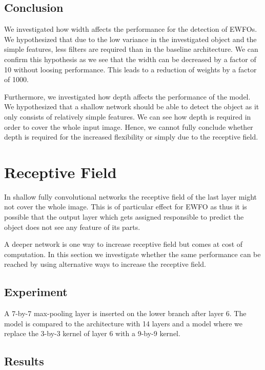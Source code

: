 	\subsection{Conclusion}
	
	We investigated how width affects the performance for the detection of \acp{EWFO}. We hypothesized that due to the low variance in the investigated object and the simple features, less filters are required than in the baseline architecture. We can confirm this hypothesis as we see that the width can be decreased by a factor of 10 without loosing performance. This leads to a reduction of weights by a factor of 1000. 
	
	Furthermore, we investigated how depth affects the performance of the model. We hypothesized that a shallow network should be able to detect the object as it only consists of relatively simple features. We can see how depth is required in order to cover the whole input image. Hence, we cannot fully conclude whether depth is required for the increased flexibility or simply due to the receptive field. 
	
	\section{Receptive Field}
	
	In shallow fully convolutional networks the receptive field of the last layer might not cover the whole image. This is of particular effect for \ac{EWFO} as thus it is possible that the output layer which gets assigned responsible to predict the object does not see any feature of its parts.
	
	A deeper network is one way to increase receptive field but comes at cost of computation. In this section we investigate whether the same performance can be reached by using alternative ways to increase the receptive field.
	
	\subsection{Experiment}
	
	 A 7-by-7 max-pooling layer is inserted on the lower branch after layer 6. The model is compared to the architecture with 14 layers and a model where we replace the 3-by-3 kernel of layer 6 with a 9-by-9 kernel.
	 
	 \subsection{Results}
	 
